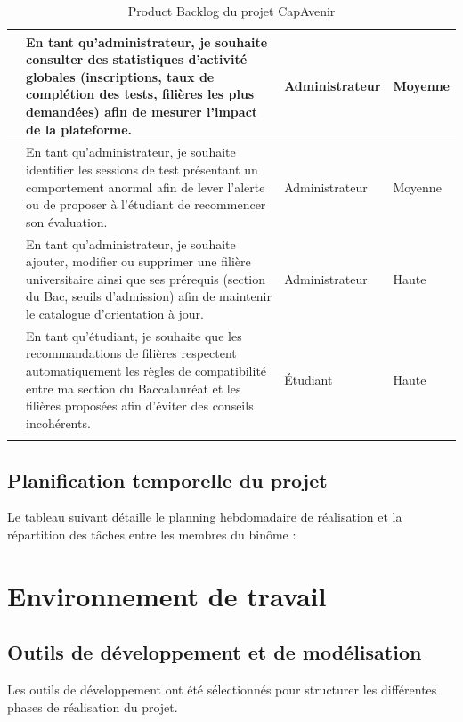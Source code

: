\begin{center}
\begin{longtable}{|>{\centering\arraybackslash}p{0.8cm}|>{\RaggedRight\arraybackslash}p{8.5cm}|>{\centering\arraybackslash}p{2.8cm}|>{\centering\arraybackslash}p{1.6cm}|}
\hline
22 & En tant qu'administrateur, je souhaite consulter des statistiques d'activité globales (inscriptions, taux de complétion des tests, filières les plus demandées) afin de mesurer l'impact de la plateforme. & Administrateur & Moyenne \\
\hline
23 & En tant qu'administrateur, je souhaite identifier les sessions de test présentant un comportement anormal afin de lever l'alerte ou de proposer à l'étudiant de recommencer son évaluation. & Administrateur & Moyenne \\
\hline
24 & En tant qu'administrateur, je souhaite ajouter, modifier ou supprimer une filière universitaire ainsi que ses prérequis (section du Bac, seuils d'admission) afin de maintenir le catalogue d'orientation à jour. & Administrateur & Haute \\
\hline
25 & En tant qu'étudiant, je souhaite que les recommandations de filières respectent automatiquement les règles de compatibilité entre ma section du Baccalauréat et les filières proposées afin d'éviter des conseils incohérents. & Étudiant & Haute \\
\hline
\caption{Product Backlog du projet CapAvenir}
\label{tab:product-backlog}
\end{longtable}
\end{center}

\subsection{Planification temporelle du projet}
Le tableau suivant détaille le planning hebdomadaire de réalisation et la répartition des tâches entre les membres du binôme :


\section{Environnement de travail}
\label{sec:environnement}

\subsection{Outils de développement et de modélisation}

Les outils de développement ont été sélectionnés pour structurer les différentes phases de réalisation du projet.

